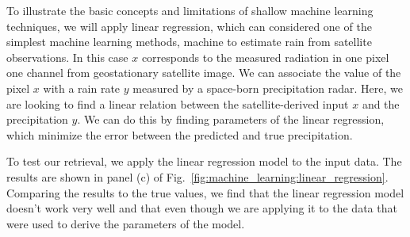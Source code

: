 To illustrate the basic concepts and limitations of shallow machine learning
techniques, we will apply linear regression, which can considered one of the
simplest machine learning methods, machine to estimate rain from satellite
observations. In this case $x$ corresponds to the measured radiation in one
pixel one channel from geostationary satellite image. We can associate the value
of the pixel $x$ with a rain rate $y$ measured by a space-born precipitation
radar. Here, we are looking to find a linear relation between the
satellite-derived input $x$ and the precipitation $y$. We can do this by
finding parameters of the linear regression, which minimize the error between 
the predicted and true precipitation.

To test our retrieval, we apply the linear regression model to the input data.
The results are shown in panel (c) of Fig.~\ref{fig:machine_learning:linear_regression}.
Comparing the results to the true values, we find that the linear regression model
doesn't work very well and that even though we are applying it to the data that were
used to derive the parameters of the model.


